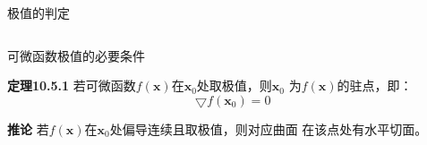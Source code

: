 \begin{frame}{极值的判定}
\begin{columns}
\begin{center}
			\end{center}
	\end{columns}
\end{frame}

\begin{frame}{可微函数极值的必要条件}
	\linespread{1.2}\pause 
	\begin{block}{{\bf 定理10.5.1}\hfill}
		若可微函数$f(\bm{x})$在$\bm{x}_0$处取极值，则$\bm{x}_0$
		为$f(\bm{x})$的{\bb 驻点}，即：
		$$\bigtriangledown f(\bm{x}_0)=0$$
	\end{block}
	\pause 
	\begin{block}{{\bf 推论}\hfill}
		若$f(\bm{x})$在$\bm{x}_0$处偏导连续且取极值，则对应曲面
		在该点处有水平切面。
	\end{block}
\end{frame}

